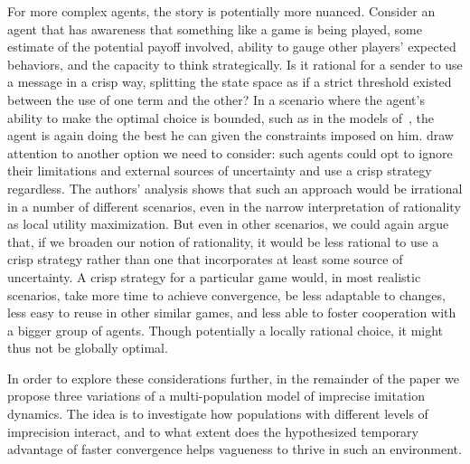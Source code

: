 \documentclass[a4paper]{article}
\begin{document}
For more complex agents, the story is potentially more nuanced.
Consider an agent that has awareness that something like a game is being played, some estimate of the potential payoff involved, ability to gauge other players' expected behaviors, and the capacity to think strategically.
Is it rational for a sender to use a message in a crisp way, splitting the state space as if a strict threshold existed between the use of one term and the other?
In a scenario where the agent's ability to make the optimal choice is bounded, such as in the models of~\textcite{franke_vagueness_2011}, the agent is again doing the best he can given the constraints imposed on him.
\textcite{lawry_vagueness_2017} draw attention to another option we need to consider: such agents could opt to ignore their limitations and external sources of uncertainty and use a crisp strategy regardless.
The authors' analysis shows that such an approach would be irrational in a number of different scenarios, even in the narrow interpretation of rationality as local utility maximization.
But even in other scenarios, we could again argue that, if we broaden our notion of rationality, it would be less rational to use a crisp strategy rather than one that incorporates at least some source of uncertainty.
A crisp strategy for a particular game would, in most realistic scenarios, take more time to achieve convergence, be less adaptable to changes, less easy to reuse in other similar games, and less able to foster cooperation with a bigger group of agents.
Though potentially a locally rational choice, it might thus not be globally optimal.

In order to explore these considerations further, in the remainder of the paper we propose three variations of a multi-population model of imprecise imitation dynamics.
The idea is to investigate how populations with different levels of imprecision interact, and to what extent does the hypothesized temporary advantage of faster convergence helps vagueness to thrive in such an environment.

\end{document}
